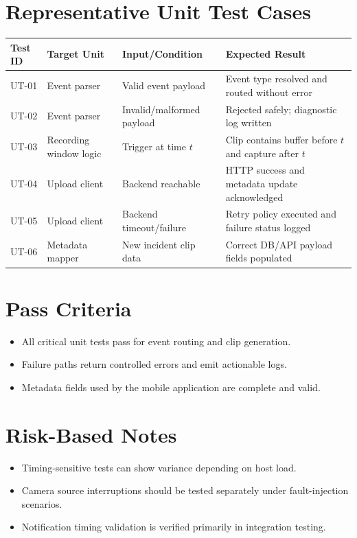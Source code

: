\section{Representative Unit Test Cases}
\begin{longtable}{|p{1.7cm}|p{4.0cm}|p{4.2cm}|p{4.3cm}|}
\hline
\textbf{Test ID} & \textbf{Target Unit} & \textbf{Input/Condition} & \textbf{Expected Result} \\
\hline
UT-01 & Event parser & Valid event payload & Event type resolved and routed without error \\
\hline
UT-02 & Event parser & Invalid/malformed payload & Rejected safely; diagnostic log written \\
\hline
UT-03 & Recording window logic & Trigger at time $t$ & Clip contains buffer before $t$ and capture after $t$ \\
\hline
UT-04 & Upload client & Backend reachable & HTTP success and metadata update acknowledged \\
\hline
UT-05 & Upload client & Backend timeout/failure & Retry policy executed and failure status logged \\
\hline
UT-06 & Metadata mapper & New incident clip data & Correct DB/API payload fields populated \\
\hline
\end{longtable}

\section{Pass Criteria}
\begin{itemize}
\item All critical unit tests pass for event routing and clip generation.
\item Failure paths return controlled errors and emit actionable logs.
\item Metadata fields used by the mobile application are complete and valid.
\end{itemize}

\section{Risk-Based Notes}
\begin{itemize}
\item Timing-sensitive tests can show variance depending on host load.
\item Camera source interruptions should be tested separately under fault-injection scenarios.
\item Notification timing validation is verified primarily in integration testing.
\end{itemize}